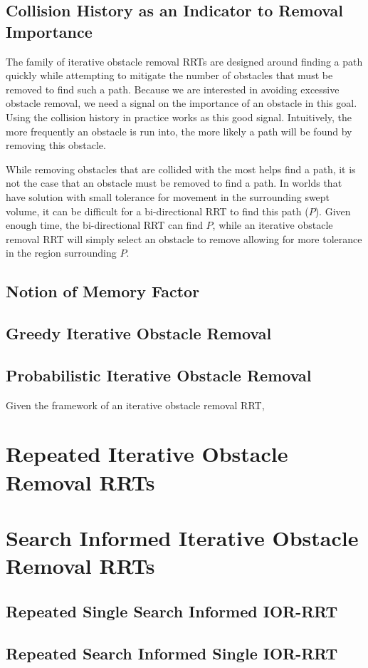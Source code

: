 \subsection{Collision History as an Indicator to Removal Importance}
The family of iterative obstacle removal RRTs are designed around finding a path quickly while attempting to mitigate the number of obstacles that must be removed to find such a path. Because we are interested in avoiding excessive obstacle removal, we need a signal on the importance of an obstacle in this goal. Using the collision history in practice works as this good signal. Intuitively, the more frequently an obstacle is run into, the more likely a path will be found by removing this obstacle.

While removing obstacles that are collided with the most helps find a path, it is not the case that an obstacle must be removed to find a path. In worlds that have solution with small tolerance for movement in the surrounding swept volume, it can be difficult for a bi-directional RRT to find this path ($P$). Given enough time, the bi-directional RRT can find $P$, while an iterative obstacle removal RRT will simply select an obstacle to remove allowing for more tolerance in the region surrounding $P$.

\subsection{Notion of Memory Factor}

\subsection{Greedy Iterative Obstacle Removal}

\subsection{Probabilistic Iterative Obstacle Removal}
Given the framework of an iterative obstacle removal RRT, 

\section{Repeated Iterative Obstacle Removal RRTs}

\section{Search Informed Iterative Obstacle Removal RRTs}

\subsection{Repeated Single Search Informed IOR-RRT}

\subsection{Repeated Search Informed Single IOR-RRT}






